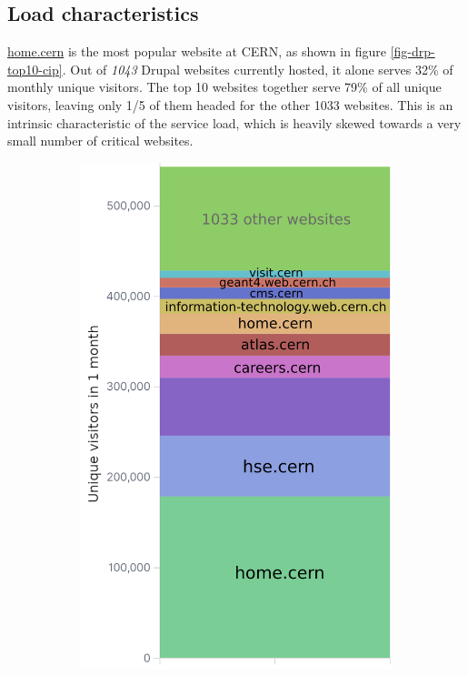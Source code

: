\subsection{Load characteristics}
\label{sec-load}

\href{https://home.cern/}{home.cern} is the most popular website at CERN, as shown in figure \ref{fig-drp-top10-cip}.
Out of \emph{1043} Drupal websites currently hosted, it alone serves 32\% of monthly unique visitors.
The top 10 websites together serve 79\% of all unique visitors, leaving only 1/5 of them headed for the other 1033 websites.
This is an intrinsic characteristic of the service load, which is heavily skewed towards a very small number of critical websites.

\begin{figure}[t]
    \centering
    \vspace{-3em}
    \begin{subfigure}[b]{.25\textwidth}
    \includegraphics[width=\textwidth]{figures/drupal-top10-uniqClientIP.png}

\end{subfigure}
\end{figure}
